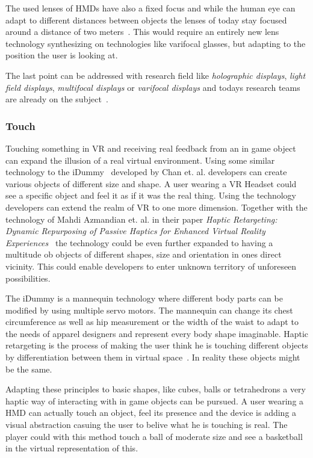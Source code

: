 The used lenses of HMDs have also a fixed focus and while the human eye can adapt to different distances between objects the lenses of today stay focused around a distance of two meters~\cite{online:oculusKeynote}. This would require an entirely new lens technology synthesizing on technologies like varifocal glasses, but adapting to the position the user is looking at.

The last point can be addressed with research field like \textit{holographic displays}, \textit{light field displays}, \textit{multifocal displays} or \textit{varifocal displays} and todays research teams are already on the subject~\cite{online:oculusKeynote}.

\subsubsection{Touch}

Touching something in VR and receiving real feedback from an in game object can expand the illusion of a real virtual environment. \newline
Using some similar technology to the iDummy~\cite{online:idummy} developed by Chan et. al. developers can create various objects of different size and shape. A user wearing a VR Headset could see a specific object and feel it as if it was the real thing. Using the technology developers can extend the realm of VR to one more dimension. Together with the technology of Mahdi Azmandian et. al. in their paper \textit{Haptic Retargeting: Dynamic Repurposing of	Passive Haptics for Enhanced Virtual Reality Experiences}~\cite{Azmandian:2016:HRD:2858036.2858226} the technology could be even further expanded to having a multitude ob objects of different shapes, size and orientation in ones direct vicinity. This could enable developers to enter unknown territory of unforeseen possibilities. 

The iDummy is a mannequin technology where different body parts can be modified by using multiple servo motors. The mannequin can change its chest circumference as well as hip measurement or the width of the waist to adapt to the needs of apparel designers and represent every body shape imaginable. \newline
Haptic retargeting is the process of making the user think he is touching different objects by differentiation between them in virtual space~\cite{Azmandian:2016:HRD:2858036.2858226}. In reality these objects might be the same. 

Adapting these principles to basic shapes, like cubes, balls or tetrahedrons a very haptic way of interacting with in game objects can be pursued. A user wearing a HMD can actually touch an object, feel its presence and the device is adding a visual abstraction casuing the user to belive what he is touching is real. The player could with this method touch a ball of moderate size and see a basketball in the virtual representation of this.

